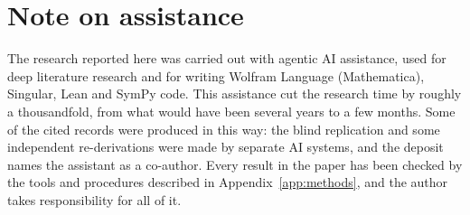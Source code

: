 \documentclass[a4paper,11pt]{article}
\theoremstyle{jsplain}
\theoremstyle{jsdef}
\theoremstyle{jsrem}
\begin{document}
\section*{Note on assistance}

The research reported here was carried out with agentic AI assistance, used for deep literature research and for writing Wolfram Language (Mathematica), Singular, Lean and SymPy code. This assistance cut the research time by roughly a thousandfold, from what would have been several years to a few months. Some of the cited records were produced in this way: the blind replication \cite{ClaudeBlind} and some independent re-derivations were made by separate AI systems, and the deposit \cite{JC125note} names the assistant as a co-author. Every result in the paper has been checked by the tools and procedures described in Appendix~\ref{app:methods}, and the author takes responsibility for all of it.
\end{document}

